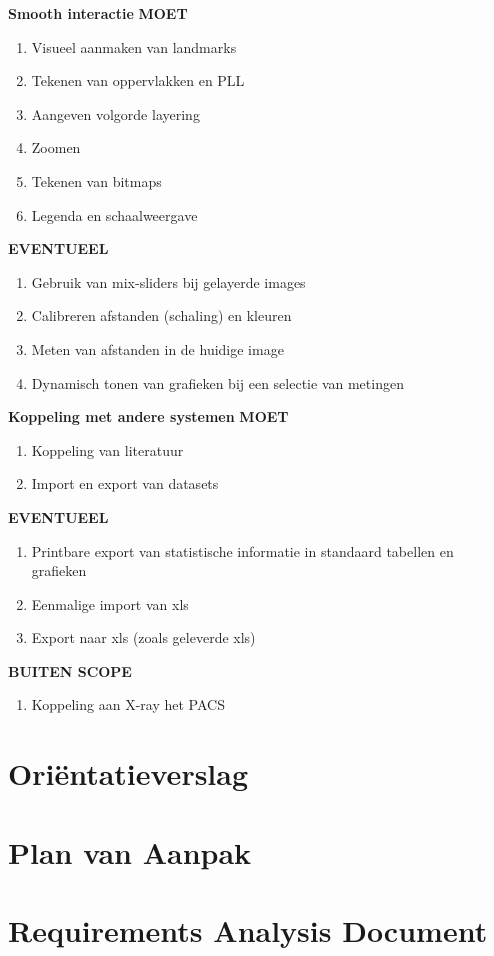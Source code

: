 \Large{\textbf{Smooth interactie}}
\large{\textbf{MOET}}
\begin{enumerate}
	\item Visueel aanmaken van landmarks
	\item Tekenen van oppervlakken en PLL
	\item Aangeven volgorde layering
	\item Zoomen
	\item Tekenen van bitmaps
	\item Legenda en schaalweergave
\end{enumerate}
\large{\textbf{EVENTUEEL}}
\begin{enumerate}
	\item Gebruik van mix-sliders bij gelayerde images
	\item Calibreren afstanden (schaling) en kleuren
	\item Meten van afstanden in de huidige image
	\item Dynamisch tonen van grafieken bij een selectie van metingen
\end{enumerate}

\Large{\textbf{Koppeling met andere systemen}}
\large{\textbf{MOET}}
\begin{enumerate}
	\item Koppeling van literatuur
	\item Import en export van datasets
\end{enumerate}
\large{\textbf{EVENTUEEL}}
\begin{enumerate}
	\item Printbare export van statistische informatie in standaard tabellen en grafieken
	\item Eenmalige import van xls
	\item Export naar xls (zoals geleverde xls)
\end{enumerate}
\large{\textbf{BUITEN SCOPE}}
\begin{enumerate}
	\item Koppeling aan X-ray het PACS
\end{enumerate}

\section{Ori\"{e}ntatieverslag}
\label{Orientatieverslag}

\section{Plan van Aanpak}
\label{PvA}

\section{Requirements Analysis Document}
\label{RAD}

